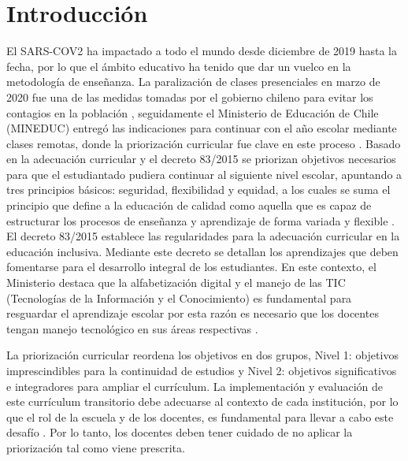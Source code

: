 \documentclass[spanish]{textolivre}
\begin{document}
\section{Introducción}\label{sec-intro}
El SARS-COV2 ha impactado a todo el mundo desde diciembre de 2019 hasta la fecha, por lo que el ámbito educativo ha tenido que dar un vuelco en la metodología de enseñanza. La paralización de clases presenciales en marzo de 2020 fue una de las medidas tomadas por el gobierno chileno para evitar los contagios en la población \cite{unesco_impacto_2020}, seguidamente el Ministerio de Educación de Chile (MINEDUC) entregó las indicaciones para continuar con el año escolar mediante clases remotas, donde la priorización curricular fue clave en este proceso \cite[p. 6-27]{unidad_de_curriculum_y_evaluacion_uce_fundamentacion_2020a}. Basado en la adecuación curricular y el decreto 83/2015 \cite[p. 10-14]{ministerio_de_educacion_mineduc_orientaciones_2017} se priorizan objetivos necesarios para que el estudiantado pudiera continuar al siguiente nivel escolar, apuntando a tres principios básicos: seguridad, flexibilidad y equidad, a los cuales se suma el principio que define a la educación de calidad como aquella que es capaz de estructurar los procesos de enseñanza y aprendizaje de forma variada y flexible \cite[p. 16]{ministerio_de_educacion_mineduc_orientaciones_2017}. El decreto 83/2015 establece las regularidades para la adecuación curricular en la educación inclusiva. Mediante este decreto se detallan los aprendizajes que deben fomentarse para el desarrollo integral de los estudiantes. En este contexto, el Ministerio destaca que la alfabetización digital y el manejo de las TIC (Tecnologías de la Información y el Conocimiento) es fundamental para resguardar el aprendizaje escolar por esta razón es necesario que los docentes tengan manejo tecnológico en sus áreas respectivas \cite[p. 8]{unidad_de_curriculum_y_evaluacion_uce_fundamentacion_2020a}.

La priorización curricular reordena los objetivos en dos grupos, Nivel 1: objetivos imprescindibles para la continuidad de estudios y Nivel 2: objetivos significativos e integradores para ampliar el currículum. La implementación y evaluación de este currículum transitorio debe adecuarse al contexto de cada institución, por lo que el rol de la escuela y de los docentes, es fundamental para llevar a cabo este desafío \cite[p. 8]{unidad_de_curriculum_y_evaluacion_uce_fundamentacion_2020a}. Por lo tanto, los docentes deben tener cuidado de no aplicar la priorización tal como viene prescrita. 
\end{document}
